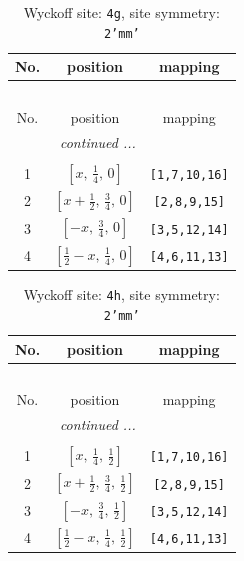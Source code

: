 \documentclass[fleqn,8pt]{jsarticle}
\begin{document}
\renewcommand{\arraystretch}{1.2}
\begin{longtable}{ccc}
\caption{Wyckoff site: {\tt 4g}, site symmetry: {\tt 2'mm'}}
 \\
 \hline \hline
No. & position & mapping \\ \hline \endfirsthead

\multicolumn{2}{l}{\tablename\ \thetable{}} \\
 \hline \hline
No. & position & mapping \\ \hline \endhead

 \hline \hline
\multicolumn{2}{r}{\footnotesize\it continued ...} \\ \endfoot

 \hline \hline
\multicolumn{2}{r}{} \\ \endlastfoot

1 & $\left[ x,\, \frac{1}{4},\, 0 \right]$ & {\tt [1,7,10,16]} \\ \hline
2 & $\left[ x + \frac{1}{2},\, \frac{3}{4},\, 0 \right]$ & {\tt [2,8,9,15]} \\ \hline
3 & $\left[ - x,\, \frac{3}{4},\, 0 \right]$ & {\tt [3,5,12,14]} \\ \hline
4 & $\left[ \frac{1}{2} - x,\, \frac{1}{4},\, 0 \right]$ & {\tt [4,6,11,13]} \\
\end{longtable}
\renewcommand{\arraystretch}{1.2}
\begin{longtable}{ccc}
\caption{Wyckoff site: {\tt 4h}, site symmetry: {\tt 2'mm'}}
 \\
 \hline \hline
No. & position & mapping \\ \hline \endfirsthead

\multicolumn{2}{l}{\tablename\ \thetable{}} \\
 \hline \hline
No. & position & mapping \\ \hline \endhead

 \hline \hline
\multicolumn{2}{r}{\footnotesize\it continued ...} \\ \endfoot

 \hline \hline
\multicolumn{2}{r}{} \\ \endlastfoot

1 & $\left[ x,\, \frac{1}{4},\, \frac{1}{2} \right]$ & {\tt [1,7,10,16]} \\ \hline
2 & $\left[ x + \frac{1}{2},\, \frac{3}{4},\, \frac{1}{2} \right]$ & {\tt [2,8,9,15]} \\ \hline
3 & $\left[ - x,\, \frac{3}{4},\, \frac{1}{2} \right]$ & {\tt [3,5,12,14]} \\ \hline
4 & $\left[ \frac{1}{2} - x,\, \frac{1}{4},\, \frac{1}{2} \right]$ & {\tt [4,6,11,13]} \\
\end{longtable}
\end{document}
